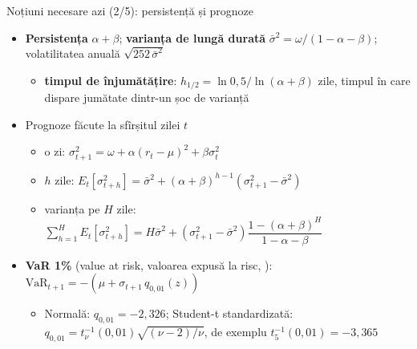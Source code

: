 \begin{frame}{Noțiuni necesare azi (2/5): persistență și prognoze}
\itemsize{\small}
\begin{itemize}
    \item \textbf{Persistența} $\alpha + \beta$; \textbf{varianța de lungă durată} $\bar\sigma^2 = \omega/(1 - \alpha - \beta)$; volatilitatea anuală $\sqrt{252\,\bar\sigma^2}$
    \begin{itemize}
        \item \textbf{timpul de înjumătățire}: $h_{1/2} = \ln 0{,}5/\ln(\alpha + \beta)$ zile, timpul în care dispare jumătate dintr-un șoc de varianță
    \end{itemize}
    \item Prognoze făcute la sfîrșitul zilei $t$
    \begin{itemize}
        \item o zi: $\sigma_{t+1}^2 = \omega + \alpha(r_t - \mu)^2 + \beta\sigma_t^2$
        \item $h$ zile: $E_t[\sigma_{t+h}^2] = \bar\sigma^2 + (\alpha + \beta)^{h-1}(\sigma_{t+1}^2 - \bar\sigma^2)$
        \item varianța pe $H$ zile: $\sum_{h=1}^{H}E_t[\sigma_{t+h}^2] = H\bar\sigma^2 + (\sigma_{t+1}^2 - \bar\sigma^2)\dfrac{1 - (\alpha + \beta)^H}{1 - \alpha - \beta}$
    \end{itemize}
    \item \textbf{VaR 1\%} (value at risk, valoarea expusă la risc, ): $\mathrm{VaR}_{t+1} = -(\mu + \sigma_{t+1}\,q_{0{,}01}(z))$
    \begin{itemize}
        \item Normală: $q_{0{,}01} = -2{,}326$; Student-t standardizată: $q_{0{,}01} = t_\nu^{-1}(0{,}01)\sqrt{(\nu - 2)/\nu}$, de exemplu $t_5^{-1}(0{,}01) = -3{,}365$
    \end{itemize}
\end{itemize}
\end{frame}

